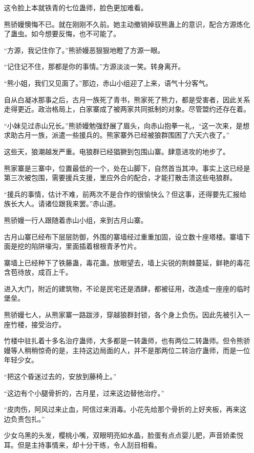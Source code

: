 \begin{this_body}
这令脸上本就铁青的七位蛊师，脸色更加难看。

熊骄嫚懊悔不已。就在刚刚不久前。她主动撤销掉驭熊蛊上的意识，配合方源炼化了蛊虫。如今想要反悔，也不可能了。

“方源，我记住你了。”熊骄嫚恶狠狠地瞪了方源一眼。

“记住记不住，那都是你的事情。”方源淡淡一笑。转身离开。

“熊小姐，我们又见面了。”那边，赤山小组迎了上来，语气十分客气。

自从白凝冰那事之后，古月一族死了青书，熊家死了熊力，都是受害者，因此关系走得更近。政治格局上，白家寨成了被两家共同抵制的对象。尽管盟约还存在着。

“小妹见过赤山兄长。”熊骄嫚勉强舒展了眉头，向赤山抱拳一礼，“这一次来，是想求助古月一族，派遣一些援兵的。熊家寨外已经被狼群围困了六天六夜了。”

这些天，狼潮越发严重。电狼群已经猖獗到包围山寨。肆意进攻的地步了。

熊家寨是三寨中，位置最低的一个，处在山脚下，自然首当其冲。事实上这已经是第三次被包围，需要援兵支援，里应外合的配合，才能打散击溃这些电狼群。

“援兵的事情，估计不难，前两次不是合作的很愉快么？但这事，还得要先汇报给族长大人。请诸位跟我来罢。”赤山道。

熊骄嫚一行人跟随着赤山小组，来到古月山寨。

古月山寨已经布下层层防御，外围的寨墙经过重重加固，设立数十座塔楼。寨墙下面是挖的陷阱壕沟，里面插着根根青矛竹片。

寨墙上已经种下了铁藤蛊，毒花蛊。放眼望去，墙上尖锐的荆棘蔓延，鲜艳的毒花含苞待放，成百上千。

进入大门，附近的建筑物，不论是民宅还是酒肆，都被征用，改造成一座座的临时堡垒。

熊骄嫚七人，从熊家寨一路跋涉，穿越狼群封锁，各个身上负伤。因此先被引入一座竹楼，接受治疗。

竹楼中驻扎着十多名治疗蛊师，大多都是一转蛊师，也有两位二转蛊师。但令熊骄嫚等人稍稍惊奇的是，主持这边局面的人，并不是那两位二转治疗蛊师，而是一位年轻少女。

“把这个昏迷过去的，安放到藤椅上。”

“这边有个小腿骨折的，古月星，过来这边替他治疗。”

“皮肉伤，阿风过来止血，阿信过来消毒。小花先给那个骨折的上好夹板，再来这边负责包扎。”

少女乌黑的头发，樱桃小嘴，双眼明亮如水晶，脸蛋有点点婴儿肥，声音娇柔悦耳。但是主持事情来，却十分干练，令人刮目相看。


\end{this_body}
